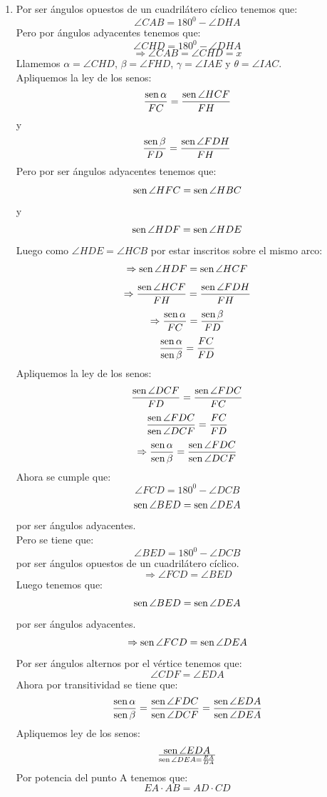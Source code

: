 \documentclass{book}
\newcommand{\sen}{\mathop{\rm sen}\nolimits} %
\begin{document}
\begin{enumerate}
\begin{enumerate}
\begin{center}
            \end{center}
            \item Por ser ángulos opuestos de un cuadrilátero cíclico tenemos que:
            $$\angle CAB=180^0-\angle DHA$$
            Pero por ángulos adyacentes tenemos que:
            $$\angle CHD=180^0-\angle DHA$$
            $$\Rightarrow\angle CAB=\angle CHD=x$$
            Llamemos $\alpha=\angle CHD$, $\beta=\angle FHD$, $\gamma =\angle IAE$ y $\theta=\angle IAC$.\\
            Apliquemos la ley de los senos:
            $${\sen \alpha\over FC}={\sen {\angle HCF}\over FH}$$
            y
            $${\sen \beta\over FD}={\sen {\angle FDH}\over FH}$$
            Pero por ser ángulos adyacentes tenemos que:
            $$\sen {\angle HFC}=\sen {\angle HBC}$$
            y
            $$\sen {\angle HDF}=\sen {\angle HDE}$$
            Luego como $\angle HDE=\angle HCB$ por estar inscritos sobre el mismo arco:
            $$\Rightarrow\sen {\angle HDF}=\sen {\angle HCF}$$
            $$\Rightarrow{\sen {\angle HCF}\over FH}={\sen {\angle FDH}\over FH}$$
            $$\Rightarrow{\sen \alpha\over FC}={\sen \beta\over FD}$$
            $${\sen \alpha\over\sen \beta}={FC\over FD}$$
            Apliquemos la ley de los senos:
            $${\sen {\angle DCF}\over FD}={\sen {\angle FDC}\over FC}$$
            $${\sen {\angle FDC}\over\sen {\angle DCF}}={FC\over FD}$$
            $$\Rightarrow{\sen \alpha\over\sen \beta}={\sen {\angle FDC}\over\sen {\angle DCF}}$$
            Ahora se cumple que:
            $$\angle FCD=180^0-\angle DCB$$
            $$\sen {\angle BED}=\sen {\angle DEA}$$
            por ser ángulos adyacentes.\\
            Pero se tiene que:
            $$\angle BED=180^0-\angle DCB$$
            por ser ángulos opuestos de un cuadrilátero cíclico.
            $$\Rightarrow\angle FCD=\angle BED$$
            Luego tenemos que:
            $$\sen {\angle BED}=\sen {\angle DEA}$$
            por ser ángulos adyacentes.
            $$\Rightarrow\sen {\angle FCD}=\sen {\angle DEA}$$
            Por ser ángulos alternos por el vértice tenemos que:
            $$\angle CDF=\angle EDA$$
            Ahora por transitividad se tiene que:
            $${\sen \alpha\over\sen \beta}={\sen {\angle FDC}\over\sen {\angle DCF}}={\sen {\angle EDA}\over\sen {\angle DEA}}$$
            Apliquemos ley de los senos:
            $$\sen {\angle EDA}\over\sen {\angle DEA}={EA\over DA}$$
            Por potencia del punto A tenemos que:
            $$EA\cdot AB=AD\cdot CD$$

\end{enumerate}
\end{enumerate}
\end{document}
